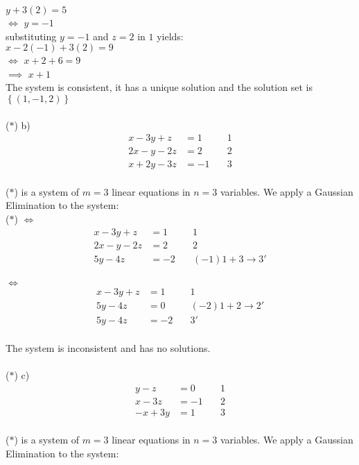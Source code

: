 \documentclass{jhwhw}
\begin{document}
\(y+3(2)=5\)\\
\(\Leftrightarrow\) \(y=-1\)\\
substituting \(y=-1\) and \(z=2\) in \(\boxed{1}\) yields:
\\
\(x-2(-1)+3(2)=9\)
\\
\(\Leftrightarrow\) \(x+2+6=9\)
\\
\(\implies\) \(x+1\) \\

The system is consistent, it has a unique solution and the solution set is \(\left\{(1,-1,2)\right\}\)
\\ \\

(\(\ast\)) b) \begin{align*} 
x-3y+z&=1 \quad &\boxed{1}\\
2x-y-2z&=2 \quad &\boxed{2}\\
x+2y-3z&=-1 \quad &\boxed{3}
\end{align*}
\\

(\(\ast\)) is a system of \(m=3\) linear equations in \(n=3\) variables. We apply a Gaussian Elimination to the system:
\\

(\(\ast\)) \(\Leftrightarrow\) \begin{align*} 
    x-3y+z&=1 \quad &\boxed{1}\\
    2x-y-2z&=2 \quad &\boxed{2}\\
    5y-4z&=-2 \quad &(-1)\boxed{1}+\boxed{3} \rightarrow \boxed{3}'
\end{align*}
\\

\(\Leftrightarrow\) \begin{align*} 
    x-3y+z&=1 \quad &\boxed{1}\\
    5y-4z&=0 \quad &(-2)\boxed{1}+\boxed{2} \rightarrow \boxed{2}'\\
    5y-4z&=-2 \quad &\boxed{3}'
\end{align*}
\\
The system is inconsistent and has no solutions.
\\ \\

(\(\ast\)) c) \begin{align*} 
y-z&=0 \quad &\boxed{1}\\
x-3z&=-1 \quad &\boxed{2}\\
-x+3y&=1 \quad &\boxed{3}
\end{align*}
\\
(\(\ast\)) is a system of \(m=3\) linear equations in \(n=3\) variables. We apply a Gaussian Elimination to the system:
\\
\end{document}
